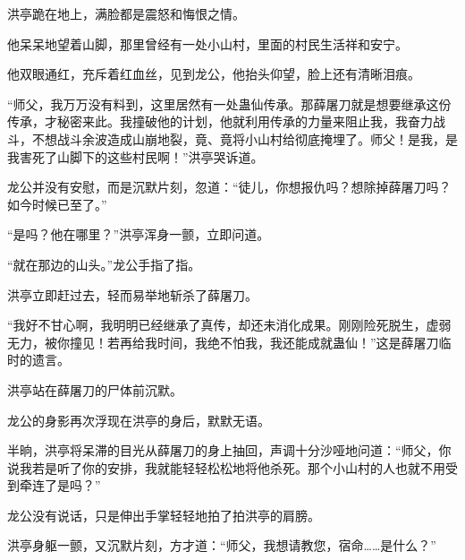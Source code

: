 \begin{this_body}
洪亭跪在地上，满脸都是震怒和悔恨之情。

他呆呆地望着山脚，那里曾经有一处小山村，里面的村民生活祥和安宁。

他双眼通红，充斥着红血丝，见到龙公，他抬头仰望，脸上还有清晰泪痕。

“师父，我万万没有料到，这里居然有一处蛊仙传承。那薛屠刀就是想要继承这份传承，才秘密来此。我撞破他的计划，他就利用传承的力量来阻止我，我奋力战斗，不想战斗余波造成山崩地裂，竟、竟将小山村给彻底掩埋了。师父！是我，是我害死了山脚下的这些村民啊！”洪亭哭诉道。

龙公并没有安慰，而是沉默片刻，忽道：“徒儿，你想报仇吗？想除掉薛屠刀吗？如今时候已至了。”

“是吗？他在哪里？”洪亭浑身一颤，立即问道。

“就在那边的山头。”龙公手指了指。

洪亭立即赶过去，轻而易举地斩杀了薛屠刀。

“我好不甘心啊，我明明已经继承了真传，却还未消化成果。刚刚险死脱生，虚弱无力，被你撞见！若再给我时间，我绝不怕我，我还能成就蛊仙！”这是薛屠刀临时的遗言。

洪亭站在薛屠刀的尸体前沉默。

龙公的身影再次浮现在洪亭的身后，默默无语。

半晌，洪亭将呆滞的目光从薛屠刀的身上抽回，声调十分沙哑地问道：“师父，你说我若是听了你的安排，我就能轻轻松松地将他杀死。那个小山村的人也就不用受到牵连了是吗？”

龙公没有说话，只是伸出手掌轻轻地拍了拍洪亭的肩膀。

洪亭身躯一颤，又沉默片刻，方才道：“师父，我想请教您，宿命……是什么？”

\end{this_body}

